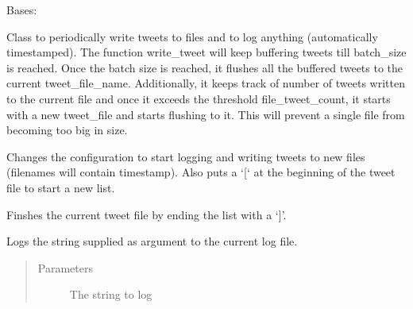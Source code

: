 \documentclass[letterpaper,10pt,english]{sphinxmanual}
\begin{document}
\begin{fulllineitems}
\label{\detokenize{twitter_stream:streaming.Logger}}
Bases: 

Class to periodically write tweets to files and to log anything (automatically timestamped).
The function write\_tweet will keep buffering tweets till batch\_size is reached. Once the batch size
is reached, it flushes all the buffered tweets to the current tweet\_file\_name. Additionally, it keeps
track of number of tweets written to the current file and once it exceeds the threshold file\_tweet\_count,
it starts with a new tweet\_file and starts flushing to it. This will prevent a single file from becoming
too big in size.

\begin{fulllineitems}
\label{\detokenize{twitter_stream:streaming.Logger.configure_new_file}}
Changes the configuration to start logging and writing tweets to new files (filenames will contain timestamp).
Also puts a ‘{[}‘ at the beginning of the tweet file to start a new list.

\end{fulllineitems}


\begin{fulllineitems}
\label{\detokenize{twitter_stream:streaming.Logger.finish_current_file}}
Finshes the current tweet file by ending the list with a ‘{]}’.

\end{fulllineitems}


\begin{fulllineitems}
\label{\detokenize{twitter_stream:streaming.Logger.log}}
Logs the string supplied as argument to the current log file.
\begin{quote}\begin{description}
\item[{Parameters}] \leavevmode
{} \textendash{} The string to log


\end{description}
\end{quote}
\end{fulllineitems}
\end{fulllineitems}
\end{document}
